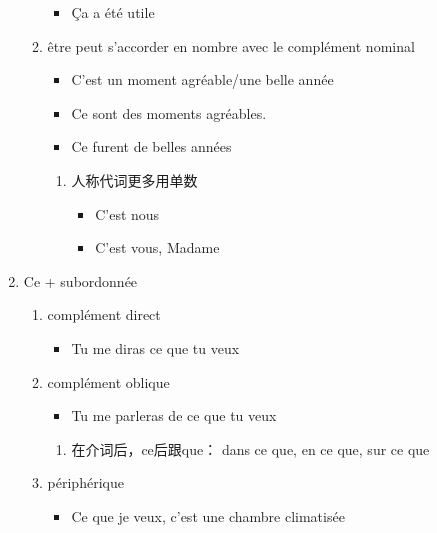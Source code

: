 \documentclass[UTF8]{report}
\begin{document}
\begin{enumerate}
\begin{enumerate}
\begin{itemize}
            \item Ça a été utile
        \end{itemize}
        \item être peut s’accorder en nombre avec le complément nominal
        \begin{itemize}
            \item C’est un moment agréable/une belle année
            \item Ce sont des moments agréables.
            \item Ce furent de belles années
        \end{itemize}
        \begin{enumerate}
            \item 人称代词更多用单数
            \begin{itemize}
                \item C’est nous
                \item C’est vous, Madame
            \end{itemize}
        \end{enumerate}
    \end{enumerate}
    \item Ce + subordonnée
    \begin{enumerate}
        \item complément direct
        \begin{itemize}
            \item Tu me diras ce que tu veux
        \end{itemize}
        \item complément oblique
        \begin{itemize}
            \item Tu me parleras de ce que tu veux
        \end{itemize}
        \begin{enumerate}
            \item 在介词后，ce后跟que： dans ce que, en ce que, sur ce que
        \end{enumerate}
        \item périphérique
        \begin{itemize}
            \item Ce que je veux, c’est une chambre climatisée
        \end{itemize}
    \end{enumerate}
\end{enumerate}
\end{document}
